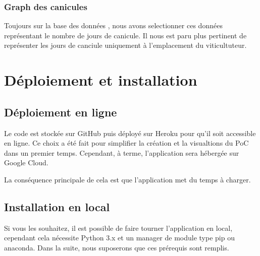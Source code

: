 \documentclass[letterpaper,10pt,french]{sphinxmanual}
\begin{document}
\subsubsection{Graph des canicules}
\label{\detokenize{indicateurs:graph-des-canicules}}
\sphinxAtStartPar
Toujours sur la base des données , nous avons selectionner ces données représentant le nombre de jours de canicule. Il nous est paru plus pertinent de représenter les jours de canciule uniquement à l’emplacement du viticultuteur.


\section{Déploiement et installation}
\label{\detokenize{use:deploiement-et-installation}}\label{\detokenize{use:instal}}\label{\detokenize{use::doc}}

\subsection{Déploiement en ligne}
\label{\detokenize{use:deploiement-en-ligne}}
\sphinxAtStartPar
Le code est stockée sur GitHub puis déployé sur Heroku pour qu’il soit accessible en ligne. Ce choix a été fait pour simplifier la création et la visualtions du PoC dans un premier temps. Cependant, à terme, l’application sera hébergée sur Google Cloud.

\sphinxAtStartPar
La conséquence principale de cela est que l’application met du temps à charger.


\subsection{Installation en local}
\label{\detokenize{use:installation-en-local}}
\sphinxAtStartPar
Si vous les souhaitez, il est possible de faire tourner l’application en local, cependant cela nécessite Python 3.x et un manager de module type pip ou anaconda.
Dans la suite, nous suposerons que ces pré\sphinxhyphen{}requis sont remplis.
\end{document}
